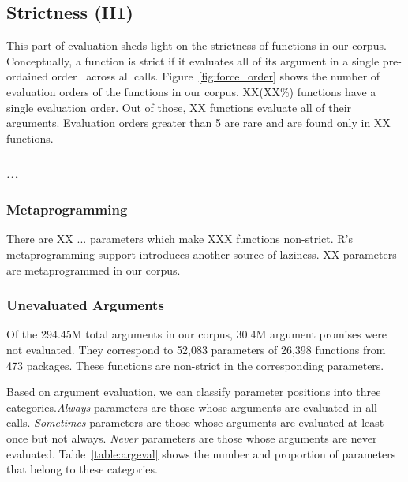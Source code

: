 \documentclass[screen,acmsmall]{acmart}
\newcommand{\always}{\emph{Always}\xspace}
\newcommand{\sometimes}{\emph{Sometimes}\xspace}
\newcommand{\never}{\emph{Never}\xspace}
\begin{document}
% 

\subsection{Strictness (H1)}

This part of evaluation sheds light on the strictness of functions in our
corpus. Conceptually, a function is strict if it evaluates all of its argument
in a single pre-ordained order~\cite{oopsla19b} across all calls.
Figure~\ref{fig:force_order} shows the number of evaluation orders of the
functions in our corpus. XX(XX\%) functions have a single evaluation order. Out
of those, XX functions evaluate all of their arguments. Evaluation orders
greater than 5 are rare and are found only in XX functions.


\subsubsection{...}

\subsubsection{Metaprogramming}
There are XX $...$ parameters which make XXX functions non-strict. R's
metaprogramming support introduces another source of laziness. XX parameters are
metaprogrammed in our corpus.

\subsubsection{Unevaluated Arguments}
Of the 294.45M total arguments in our corpus, 30.4M argument promises were not
evaluated. They correspond to 52,083 parameters of 26,398 functions from 473
packages. These functions are non-strict in the corresponding parameters.

Based on argument evaluation, we can classify parameter positions into three
categories.\always parameters are those whose arguments are evaluated in all
calls. \sometimes parameters are those whose arguments are evaluated at least
once but not always. \never parameters are those whose arguments are never
evaluated. Table~\ref{table:argeval} shows the number and proportion of
parameters that belong to these categories.
\end{document}
